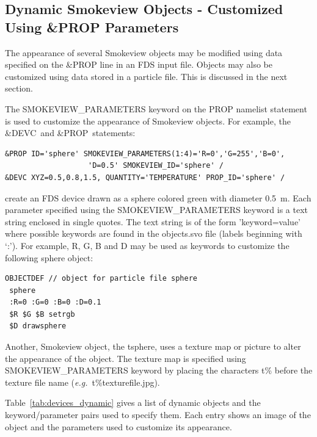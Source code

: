 \subsection{Dynamic Smokeview Objects - Customized Using \&PROP Parameters}
\label{info:SMOKEVIEW_PARAMETERS}

The appearance of several Smokeview objects may be modified using data specified on the {\ct \&PROP} line in an FDS input
file.  Objects may also be customized using data stored in a particle file.  This is discussed in the next section.

The {\ct SMOKEVIEW\_PARAMETERS} keyword on the {\ct PROP}
namelist statement is used to customize the appearance of Smokeview objects.  For example, the {\ct \&DEVC}\ and {\ct \&PROP}\ statements:

\footnotesize
\begin{verbatim}
&PROP ID='sphere' SMOKEVIEW_PARAMETERS(1:4)='R=0','G=255','B=0',
                   'D=0.5' SMOKEVIEW_ID='sphere' /
&DEVC XYZ=0.5,0.8,1.5, QUANTITY='TEMPERATURE' PROP_ID='sphere' /
\end{verbatim} \normalsize

\noindent
create an FDS device drawn as a sphere colored green with diameter 0.5~m. Each parameter specified using the
{\ct SMOKEVIEW\_PARAMETERS} keyword
is a text string enclosed in single quotes.  The text string is of the form {\ct 'keyword=value'} where possible
keywords are found in the {\ct objects.svo} file (labels beginning with `:').  For example, {\ct R}, {\ct G},
{\ct B} and {\ct D} may be used as keywords to customize the following {\ct sphere} object:

\footnotesize
\begin{verbatim}
OBJECTDEF // object for particle file sphere
 sphere
 :R=0 :G=0 :B=0 :D=0.1
 $R $G $B setrgb
 $D drawsphere
\end{verbatim} \normalsize

\noindent Another, Smokeview object, the {\ct tsphere}, uses a texture map or picture to alter the appearance of the object.
The texture map is specified using {\ct SMOKEVIEW\_PARAMETERS} keyword by placing the characters {\ct t\%}
before the texture file name ({\em e.g.}\ {\ct t\%texturefile.jpg}).

Table~\ref{tab:devices_dynamic} gives a list of dynamic objects and the keyword/parameter pairs used to specify them.
Each entry shows an image of the object and the parameters used to customize its appearance.

